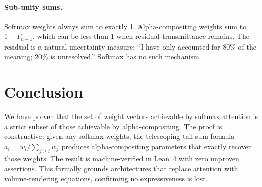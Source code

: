\documentclass[11pt]{article}
\begin{document}
\paragraph{Sub-unity sums.} Softmax weights always sum to exactly 1. Alpha-compositing weights sum to $1 - T_{n+1}$, which can be less than 1 when residual transmittance remains. The residual is a natural uncertainty measure: ``I have only accounted for 80\% of the meaning; 20\% is unresolved.'' Softmax has no such mechanism.

\section{Conclusion}

We have proven that the set of weight vectors achievable by softmax attention is a strict subset of those achievable by alpha-compositing. The proof is constructive: given any softmax weights, the telescoping tail-sum formula $a_i = w_i / \sum_{j \geq i} w_j$ produces alpha-compositing parameters that exactly recover those weights. The result is machine-verified in Lean~4 with zero unproven assertions. This formally grounds architectures that replace attention with volume-rendering equations, confirming no expressiveness is lost.
\end{document}
